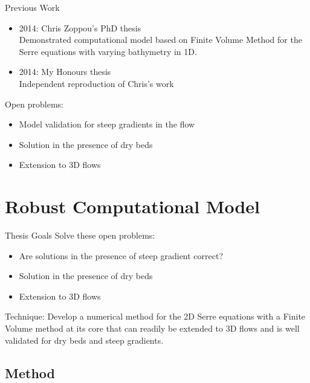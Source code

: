 \documentclass[pdf]{beamer}
\begin{document}
\begin{frame}{Previous Work}
	\begin{itemize}
		\item 2014: Chris Zoppou's PhD thesis \\
			Demonstrated computational model based on Finite Volume Method for the Serre equations with varying bathymetry in 1D.
		\item 2014: My Honours thesis \\
			Independent reproduction of Chris's work
	\end{itemize}
	Open problems:
	\begin{itemize}
		\item Model validation for steep gradients in the flow
		\item Solution in the presence of dry beds
		\item Extension to 3D flows
	\end{itemize}	
\end{frame}



\section{Robust Computational Model}

\begin{frame}{Thesis Goals}
	Solve these open problems:
	\begin{itemize}
		\item Are solutions in the presence of steep gradient correct?
		\item Solution in the presence of dry beds
		\item Extension to 3D flows
	\end{itemize}
	Technique: Develop a numerical method for the 2D Serre equations with a Finite Volume method at its core that can readily be extended to 3D flows and is well validated for dry beds and steep gradients. 
\end{frame}

\subsection{Method}
\end{document}
